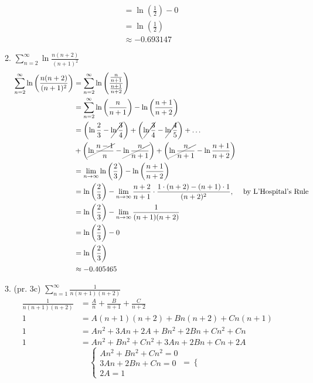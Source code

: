 \documentclass[12pt,letterpaper]{article}
\newcommand{\limx}[2]{\displaystyle\lim\limits_{#1 \to #2}}
\theoremstyle{case}
\theoremstyle{definition}
\begin{document}
\begin{enumerate}
\begin{enumerate}
\begin{align*}
				&= \ln\left(\frac{1}{2}\right) - 0 \\
				&= \ln\left(\frac{1}{2}\right) \\
				&\approx -0.693147
			\end{align*}
			\item $\displaystyle\sum_{n=2}^{\infty} \ln \frac{n(n+2)}{(n+1)^2}$
			\begin{align*}
				\sum_{n=2}^{\infty} \ln\left(\frac{n(n+2)}{(n+1)^2}\right) &= \sum_{n=2}^{\infty} \ln \left(\frac{\frac{n}{n+1}}{\frac{n+1}{n+2}}\right) \\
				&= \sum_{n=2}^{\infty} \ln\left(\frac{n}{n+1}\right) - \ln\left(\frac{n+1}{n+2}\right)  \\
				&= \left(\ln \frac{2}{3}-\cancel{\ln \frac{3}{4}}\right) + \left(\cancel{\ln \frac{3}{4}}-\cancel{\ln \frac{4}{5}}\right) + \dots \\
				&+ \left(\cancel{\ln \frac{n-1}{n}}-\cancel{\ln\frac{n}{n+1}}\right) + \left(\cancel{\ln \frac{n}{n+1}}-\ln\frac{n+1}{n+2}\right) \\
				&= \limx{n}{\infty}\ln \left(\frac{2}{3}\right) - \ln \left(\frac{n+1}{n+2}\right) \\
				&= \ln \left(\frac{2}{3}\right)-\limx{n}{\infty} \frac{n+2}{n+1} \cdot \frac{1\cdot (n+2) - (n+1)\cdot 1}{(n+2)^2}, &\text{by L'Hospital's Rule} \\
				&= \ln \left(\frac{2}{3}\right)- \limx{n}{\infty} \frac{1}{(n+1)(n+2)} \\
				&= \ln \left(\frac{2}{3}\right) - 0 \\
				&= \ln \left(\frac{2}{3}\right) \\
				&\approx -0.405465
			\end{align*}
			\item (pr. 3c) $\displaystyle\sum_{n=1}^{\infty} \frac{1}{n(n+1)(n+2)}$
			\begin{align*}
				\frac{1}{n(n+1)(n+2)} &= \frac{A}{n} + \frac{B}{n+1} + \frac{C}{n+2} \\
				1&=A(n+1)(n+2) + Bn(n+2)+Cn(n+1) \\
				1&=An^2+3An+2A+Bn^2+2Bn+Cn^2+Cn \\
				1&= An^2+Bn^2+Cn^2+3An+2Bn+Cn+2A
			\end{align*}
			\[\begin{cases}
			An^2+Bn^2+Cn^2=0 \\
			3An+2Bn+Cn=0 \\
			2A=1
			\end{cases} = \begin{cases}

\end{cases}\]
\end{enumerate}
\end{enumerate}
\end{document}
